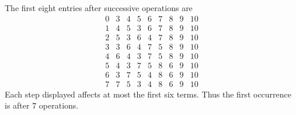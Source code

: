 The first eight entries after successive operations are\[\begin{array}{c|rrrrrrrr}0&3&4&5&6&7&8&9&10\\1&4&5&3&6&7&8&9&10\\2&5&3&6&4&7&8&9&10\\3&3&6&4&7&5&8&9&10\\4&6&4&3&7&5&8&9&10\\5&4&3&7&5&8&6&9&10\\6&3&7&5&4&8&6&9&10\\7&7&5&3&4&8&6&9&10\end{array}\]Each step displayed affects at most the first six terms. Thus the first occurrence is after $\boxed7$ operations.
